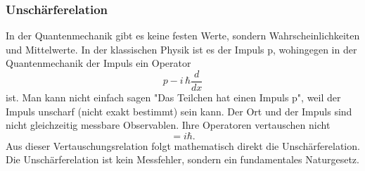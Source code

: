 \subsubsection{Unschärferelation
\label{fourier:subsubsection:Unschaerferelation}}
In der Quantenmechanik gibt es keine festen Werte, sondern Wahrscheinlichkeiten und Mittelwerte.
In der klassischen Physik ist es der Impuls p, wohingegen in der Quantenmechanik der Impuls ein Operator 
\begin{equation}
	p - i \, \hbar \frac{d}{dx}
\end{equation}
ist.
Man kann nicht einfach sagen "Das Teilchen hat einen Impuls p", weil der Impuls unscharf (nicht exakt bestimmt) sein kann.
Der Ort und der Impuls sind nicht gleichzeitig messbare Observablen.
Ihre Operatoren vertauschen nicht
\begin{equation}
    [\hat{x}, \hat{p}] = i\hbar.
\end{equation}
Aus dieser Vertauschungsrelation folgt mathematisch direkt die Unschärferelation.
Die Unschärferelation ist kein Messfehler, sondern ein fundamentales Naturgesetz.
